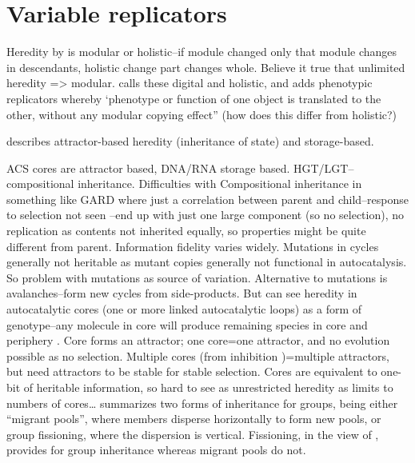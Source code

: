 \section{Variable replicators}
\begin{NOTES}
Heredity by \cite{MaynardSmith1999} is modular or holistic--if module changed only that module changes in descendants, holistic change part changes whole. Believe it true that unlimited heredity => modular. \cite{Szathmary1999} calls these digital and holistic, and adds phenotypic replicators whereby ‘phenotype or function of one object is translated to the other, without any modular copying effect” (how does this differ from holistic?)

\cite{Hogeweg1998} describes attractor-based heredity (inheritance of state) and storage-based. 

\cite{Vasas2012a} ACS cores are attractor based, DNA/RNA storage based. HGT/LGT--compositional inheritance.
Difficulties with Compositional inheritance in something like GARD where just a correlation between parent and child--response to selection not seen \parencite{Vasas2015}--end up with just one large component (so no selection), no replication as contents not inherited equally, so properties might be quite different from parent. Information fidelity varies widely. Mutations in cycles \parencite{Vasas2012a} generally not heritable as mutant copies generally not functional in autocatalysis. So problem with mutations as source of variation. Alternative to mutations is avalanches--form new cycles from side-products.
But can see heredity in autocatalytic cores (one or more linked autocatalytic loops) as a form of genotype--any molecule in core will produce remaining species in core and periphery \parencite{Vasas2012a}. Core forms an attractor; one core=one attractor, and no evolution possible as no selection. Multiple cores (from inhibition \cite{Vasas2012a})=multiple attractors, but need attractors to be stable for stable selection. Cores are equivalent to one-bit of heritable information, so hard to see as unrestricted heredity as limits to numbers of cores…
\cite{Watson2015} summarizes two forms of inheritance for groups, being either ``migrant pools'', where members disperse horizontally to form new pools, or group fissioning, where the dispersion is vertical. Fissioning, in the view of \cite{Watson2015}, provides for group inheritance whereas migrant pools do not.

			

\end{NOTES}
